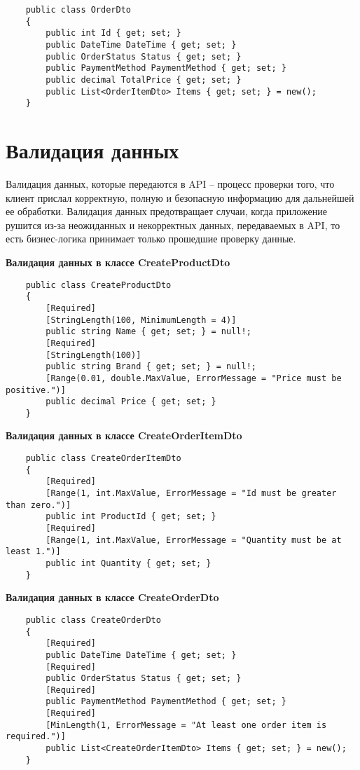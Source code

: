 \documentclass[a4paper,12pt]{report}
\begin{document}
\begin{verbatim}
    public class OrderDto
    {
        public int Id { get; set; }
        public DateTime DateTime { get; set; }
        public OrderStatus Status { get; set; }
        public PaymentMethod PaymentMethod { get; set; }
        public decimal TotalPrice { get; set; }
        public List<OrderItemDto> Items { get; set; } = new();
    }
\end{verbatim}

\section{Валидация данных}

Валидация данных, которые передаются в \acs{API} -- процесс проверки того, что клиент прислал корректную, полную и безопасную информацию для дальнейшей ее обработки. 
Валидация данных предотвращает случаи, когда приложение рушится из-за неожиданных и некорректных данных, передаваемых в \acs{API}, то есть бизнес-логика принимает 
только прошедшие проверку данные.

\textbf{Валидация данных в классе CreateProductDto}
\begin{verbatim}
    public class CreateProductDto
    {
        [Required]
        [StringLength(100, MinimumLength = 4)]
        public string Name { get; set; } = null!;
        [Required]
        [StringLength(100)]
        public string Brand { get; set; } = null!;
        [Range(0.01, double.MaxValue, ErrorMessage = "Price must be positive.")]
        public decimal Price { get; set; }
    }
\end{verbatim}

\textbf{Валидация данных в классе CreateOrderItemDto}
\begin{verbatim}
    public class CreateOrderItemDto
    {
        [Required]
        [Range(1, int.MaxValue, ErrorMessage = "Id must be greater than zero.")]
        public int ProductId { get; set; }
        [Required]
        [Range(1, int.MaxValue, ErrorMessage = "Quantity must be at least 1.")]
        public int Quantity { get; set; }
    }
\end{verbatim}

\textbf{Валидация данных в классе CreateOrderDto}
\begin{verbatim}
    public class CreateOrderDto
    {
        [Required]
        public DateTime DateTime { get; set; }
        [Required]
        public OrderStatus Status { get; set; }
        [Required]
        public PaymentMethod PaymentMethod { get; set; }
        [Required]
        [MinLength(1, ErrorMessage = "At least one order item is required.")]
        public List<CreateOrderItemDto> Items { get; set; } = new();
    }
\end{verbatim}
\end{document}
